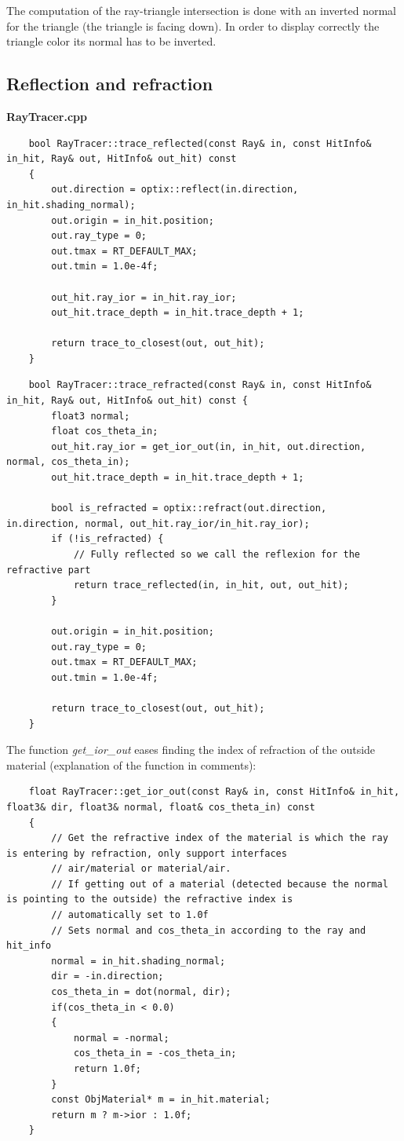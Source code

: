\documentclass[a4,12pt]{article}
\begin{document}
	The computation of the ray-triangle intersection is done with an inverted normal for the triangle (the triangle is facing down). In order to display correctly the triangle color its normal has to be inverted.
	
	\subsection{Reflection and refraction}
	\textbf{RayTracer.cpp}
	\begin{lstlisting}
	bool RayTracer::trace_reflected(const Ray& in, const HitInfo& in_hit, Ray& out, HitInfo& out_hit) const
	{
		out.direction = optix::reflect(in.direction, in_hit.shading_normal);
		out.origin = in_hit.position;
		out.ray_type = 0;
		out.tmax = RT_DEFAULT_MAX;
		out.tmin = 1.0e-4f;
		
		out_hit.ray_ior = in_hit.ray_ior;
		out_hit.trace_depth = in_hit.trace_depth + 1;
		
		return trace_to_closest(out, out_hit);
	}
	\end{lstlisting}
	
	\begin{lstlisting}
	bool RayTracer::trace_refracted(const Ray& in, const HitInfo& in_hit, Ray& out, HitInfo& out_hit) const {
		float3 normal;
		float cos_theta_in;
		out_hit.ray_ior = get_ior_out(in, in_hit, out.direction, normal, cos_theta_in);
		out_hit.trace_depth = in_hit.trace_depth + 1;
		
		bool is_refracted = optix::refract(out.direction, in.direction, normal, out_hit.ray_ior/in_hit.ray_ior);
		if (!is_refracted) {
			// Fully reflected so we call the reflexion for the refractive part
			return trace_reflected(in, in_hit, out, out_hit);
		}
		
		out.origin = in_hit.position;
		out.ray_type = 0;
		out.tmax = RT_DEFAULT_MAX;
		out.tmin = 1.0e-4f;
		
		return trace_to_closest(out, out_hit);
	}
	\end{lstlisting}
	
	The function \textit{get\_ior\_out} eases finding the index of refraction of the outside material (explanation of the function in comments):
	\begin{lstlisting}
	float RayTracer::get_ior_out(const Ray& in, const HitInfo& in_hit, float3& dir, float3& normal, float& cos_theta_in) const
	{
		// Get the refractive index of the material is which the ray is entering by refraction, only support interfaces
		// air/material or material/air.
		// If getting out of a material (detected because the normal is pointing to the outside) the refractive index is
		// automatically set to 1.0f
		// Sets normal and cos_theta_in according to the ray and hit_info
		normal = in_hit.shading_normal;
		dir = -in.direction;
		cos_theta_in = dot(normal, dir);
		if(cos_theta_in < 0.0)
		{
			normal = -normal;
			cos_theta_in = -cos_theta_in;
			return 1.0f;
		}
		const ObjMaterial* m = in_hit.material;
		return m ? m->ior : 1.0f;
	}
	\end{lstlisting}
	
\end{document}
